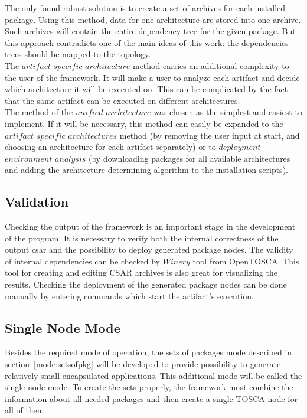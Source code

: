 The only found robust solution is to create a set of archives for each installed package. Using this method, data for one architecture are stored into one archive.
Such archives will contain the entire dependency tree for the given package.
But this approach contradicts one of the main ideas of this work: the dependencies trees should be mapped to the topology.\\
The $artifact$ $specific$ $architecture$ method carries an additional complexity to the user of the framework.
It will make a user to analyze each artifact and decide which architecture it will be executed on. 
This can be complicated by the fact that the same artifact can be executed on different architectures.\\
The method of the $unified$ $architecture$ was chosen as the simplest and easiest to implement.
If it will be necessary, this method can easily be expanded to the $artifact$ $specific$ $architectures$ method (by removing the user input at start, and choosing an architecture for each artifact separately) or to $deployment$ $environment$ $analysis$ (by downloading packages for all available architectures and adding the architecture determining algorithm to the installation scripts).

%

\subsection{Validation}
Checking the output of the framework is an important stage in the development of the program.
It is necessary to verify both the internal correctness of the output \gls{csar} and the possibility to deploy generated package nodes.
The validity of internal dependencies can be checked by $Winery$ tool from OpenTOSCA.
This tool for creating and editing CSAR archives is also great for visualizing the results.
Checking the deployment of the generated package nodes can be done manually by entering commands which start the  artifact's execution.

\subsection{Single Node Mode}
Besides the required mode of operation, the sets of packages mode described in section~\ref{mode:setsofpkg} will be  developed to provide possibility to generate relatively small encapsulated applications.
This additional mode will be called the single node mode.
To create the sets properly, the framework must combine the information about all needed packages and then create a single TOSCA node for all of them.


